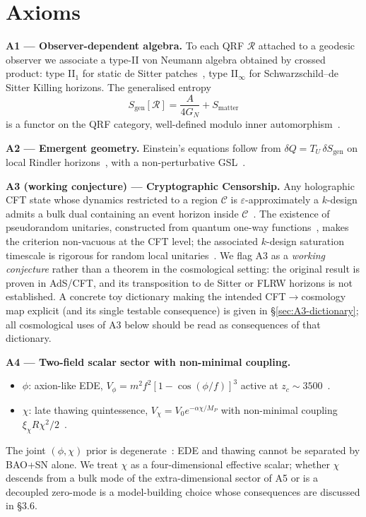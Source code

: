 \documentclass[epjc3,twocolumn]{svjour3}
\begin{document}
\section{Axioms}\label{sec:axioms}

\noindent\textbf{A1 --- Observer-dependent algebra.}
To each QRF $\mathcal{R}$ attached to a geodesic observer we associate a type-II von Neumann algebra obtained by crossed product: type II$_1$ for static de Sitter patches~\cite{CLPW2023}, type II$_\infty$ for Schwarzschild--de Sitter Killing horizons. The generalised entropy
\begin{equation}
S_{\mathrm{gen}}[\mathcal{R}] = \frac{A}{4 G_N} + S_{\mathrm{matter}}
\end{equation}
is a functor on the QRF category, well-defined modulo inner automorphism~\cite{DEHK2025a,DEHK2025b}.

\smallskip
\noindent\textbf{A2 --- Emergent geometry.}
Einstein's equations follow from $\delta Q = T_U \, \delta S_{\mathrm{gen}}$ on local Rindler horizons~\cite{Jacobson1995}, with a non-perturbative GSL~\cite{FaulknerSperanza2024,Kirklin2025}.

\smallskip
\noindent\textbf{A3 (working conjecture) --- Cryptographic Censorship.}
Any holographic CFT state whose dynamics restricted to a region $\mathcal{C}$ is $\varepsilon$-approximately a $k$-design admits a bulk dual containing an event horizon inside $\mathcal{C}$~\cite{CryptoCensorship}. The existence of pseudorandom unitaries, constructed from quantum one-way functions~\cite{MaHuang2025}, makes the criterion non-vacuous at the CFT level; the associated $k$-design saturation timescale is rigorous for random local unitaries~\cite{Haferkamp2022}. We flag A3 as a \emph{working conjecture} rather than a theorem in the cosmological setting: the original result is proven in AdS/CFT, and its transposition to de Sitter or FLRW horizons is not established. A concrete toy dictionary making the intended CFT$\to$cosmology map explicit (and its single testable consequence) is given in \S\ref{sec:A3-dictionary}; all cosmological uses of A3 below should be read as consequences of that dictionary.

\smallskip
\noindent\textbf{A4 --- Two-field scalar sector with non-minimal coupling.}
\begin{itemize}
\item $\phi$: axion-like EDE, $V_\phi = m^2 f^2 [1-\cos(\phi/f)]^3$ active at $z_c \sim 3500$~\cite{Poulin2019}.
\item $\chi$: late thawing quintessence, $V_\chi = V_0 e^{-\alpha \chi / M_P}$ with non-minimal coupling $\xi_\chi R \chi^2 / 2$~\cite{Ye2025,Wolf2025,PanYe2026}.
\end{itemize}
The joint $(\phi,\chi)$ prior is degenerate~\cite{WangPiao2025}: EDE and thawing cannot be separated by BAO+SN alone. We treat $\chi$ as a four-dimensional effective scalar; whether $\chi$ descends from a bulk mode of the extra-dimensional sector of A5 or is a decoupled zero-mode is a model-building choice whose consequences are discussed in \S3.6.
\end{document}
